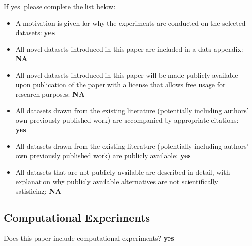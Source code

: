 If yes, please complete the list below:
\begin{itemize}
    \item[] A motivation is given for why the experiments are conducted on the selected datasets: \textbf{yes}
    \item[] All novel datasets introduced in this paper are included in a data appendix: \textbf{NA}
    \item[] All novel datasets introduced in this paper will be made publicly available upon publication of the paper with a license that allows free usage for research purposes: \textbf{NA}
    \item[] All datasets drawn from the existing literature (potentially including authors' own previously published work) are accompanied by appropriate citations: \textbf{yes}
    \item[] All datasets drawn from the existing literature (potentially including authors' own previously published work) are publicly available: \textbf{yes}
    \item[] All datasets that are not publicly available are described in detail, with explanation why publicly available alternatives are not scientifically satisficing: \textbf{NA}
\end{itemize}

\subsection*{Computational Experiments}
Does this paper include computational experiments? \textbf{yes}

